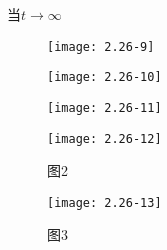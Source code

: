 \scalebox{2}{（4）}

当$t\rightarrow \infty$

\begin{figure}[H] %
	\begin{minipage}{\linewidth}
		\texttt{[image: 2.26-9]}
	\end{minipage}
\end{figure}

\begin{figure}[H] %
	\begin{minipage}{\linewidth}
		\texttt{[image: 2.26-10]}
	\end{minipage}
\end{figure}

\begin{figure}[H] %
	\begin{minipage}{\linewidth}
		\texttt{[image: 2.26-11]}
	\end{minipage}
\end{figure}

		\begin{figure}[H] %
	\begin{minipage}{\linewidth}
		\texttt{[image: 2.26-12]}
	\end{minipage}
	\caption*{图2} %
\end{figure}

		\begin{figure}[H] %
	\begin{minipage}{\linewidth}
		\texttt{[image: 2.26-13]}
	\end{minipage}
	\caption*{图3} %
\end{figure}

